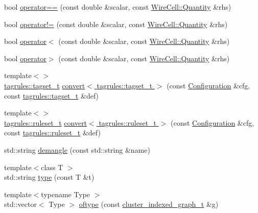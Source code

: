 \begin{DoxyCompactItemize}
\item 
bool \hyperlink{namespace_wire_cell_acaced6e975be88ae44140c377b0b1ae6}{operator==} (const double \&scalar, const \hyperlink{class_wire_cell_1_1_quantity}{Wire\+Cell\+::\+Quantity} \&rhs)
\item 
bool \hyperlink{namespace_wire_cell_a4fb5edb30adbb46dbfcc72e2066c4268}{operator!=} (const double \&scalar, const \hyperlink{class_wire_cell_1_1_quantity}{Wire\+Cell\+::\+Quantity} \&rhs)
\item 
bool \hyperlink{namespace_wire_cell_a143feb235cfb5761b0691c4d1c129ca3}{operator$<$} (const double \&scalar, const \hyperlink{class_wire_cell_1_1_quantity}{Wire\+Cell\+::\+Quantity} \&rhs)
\item 
bool \hyperlink{namespace_wire_cell_a58f770141d858d0d03024cfafadc2f6a}{operator$>$} (const double \&scalar, const \hyperlink{class_wire_cell_1_1_quantity}{Wire\+Cell\+::\+Quantity} \&rhs)
\item 
{\footnotesize template$<$$>$ }\\\hyperlink{namespace_wire_cell_1_1tagrules_a80263165e3d13e49e317c045829f76cb}{tagrules\+::tagset\+\_\+t} \hyperlink{namespace_wire_cell_a02c87570501f0be739835ce24816d926}{convert$<$ tagrules\+::tagset\+\_\+t $>$} (const \hyperlink{namespace_wire_cell_a9f705541fc1d46c608b3d32c182333ee}{Configuration} \&cfg, const \hyperlink{namespace_wire_cell_1_1tagrules_a80263165e3d13e49e317c045829f76cb}{tagrules\+::tagset\+\_\+t} \&def)
\item 
{\footnotesize template$<$$>$ }\\\hyperlink{namespace_wire_cell_1_1tagrules_a93f5672d7c60d5f990b42dd93fd0aee2}{tagrules\+::ruleset\+\_\+t} \hyperlink{namespace_wire_cell_a3f34e0b2564286f437cd0a76970f6806}{convert$<$ tagrules\+::ruleset\+\_\+t $>$} (const \hyperlink{namespace_wire_cell_a9f705541fc1d46c608b3d32c182333ee}{Configuration} \&cfg, const \hyperlink{namespace_wire_cell_1_1tagrules_a93f5672d7c60d5f990b42dd93fd0aee2}{tagrules\+::ruleset\+\_\+t} \&def)
\item 
std\+::string \hyperlink{namespace_wire_cell_a7d0326b3a49de0eeba671d6dc20a1959}{demangle} (const std\+::string \&name)
\item 
{\footnotesize template$<$class T $>$ }\\std\+::string \hyperlink{namespace_wire_cell_a1f69a2598e2cdb413ffac1157b50670a}{type} (const T \&t)
\item 
{\footnotesize template$<$typename Type $>$ }\\std\+::vector$<$ Type $>$ \hyperlink{namespace_wire_cell_ae4db8903c9e13b5563b27842413aa9ff}{oftype} (const \hyperlink{namespace_wire_cell_a81d03e7272d04b607afc90bd3f7a9499}{cluster\+\_\+indexed\+\_\+graph\+\_\+t} \&g)

\end{DoxyCompactItemize}

